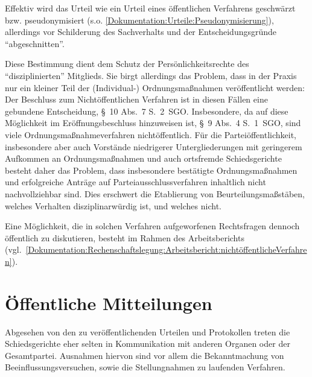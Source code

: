Effektiv wird das Urteil wie ein Urteil eines öffentlichen Verfahrens geschwärzt bzw. pseudonymisiert (s.o. \ref{Dokumentation:Urteile:Pseudonymisierung}), allerdings vor Schilderung des Sachverhalts und der Entscheidungsgründe \enquote{abgeschnitten}.

Diese Bestimmung dient dem Schutz der Persönlichkeitsrechte des \enquote{disziplinierten} Mitglieds.
Sie birgt allerdings das Problem, dass in der Praxis nur ein kleiner Teil der (Individual-) Ordnungsmaßnahmen veröffentlicht werden:
Der Beschluss zum Nichtöffentlichen Verfahren ist in diesen Fällen eine gebundene Entscheidung, \S~10 Abs.~7 S.~2~SGO.
Insbesondere, da auf diese Möglichkeit im Eröffnungsbeschluss hinzuweisen ist, \S~9 Abs.~4 S.~1~SGO, sind viele Ordnungsmaßnahmeverfahren nichtöffentlich.
Für die Parteiöffentlichkeit, insbesondere aber auch Vorstände niedrigerer Untergliederungen mit geringerem Aufkommen an Ordnungsmaßnahmen und auch ortsfremde Schiedsgerichte besteht daher das Problem, dass insbesondere bestätigte Ordnungsmaßnahmen und erfolgreiche Anträge auf Parteiausschlussverfahren inhaltlich nicht nachvollziehbar sind.
Dies erschwert die Etablierung von Beurteilungsmaßstäben, welches Verhalten disziplinarwürdig ist, und welches nicht.

Eine Möglichkeit, die in solchen Verfahren aufgeworfenen Rechtsfragen dennoch öffentlich zu diskutieren, besteht im Rahmen des Arbeitsberichts (vgl.~\ref{Dokumentation:Rechenschaftslegung:Arbeitsbericht:nichtöffentlicheVerfahren}).

\section{Öffentliche Mitteilungen}
\label{Dokumentation:Veröffentlichungen}
Abgesehen von den zu veröffentlichenden Urteilen und Protokollen treten die Schiedsgerichte eher selten in Kommunikation mit anderen Organen oder der Gesamtpartei.
Ausnahmen hiervon sind vor allem die Bekanntmachung von Beeinflussungsversuchen, sowie die Stellungnahmen zu laufenden Verfahren.

